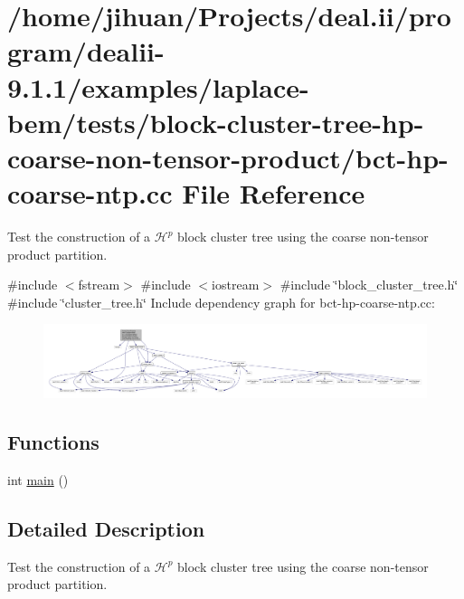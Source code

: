 \hypertarget{bct-hp-coarse-ntp_8cc}{}\section{/home/jihuan/\+Projects/deal.ii/program/dealii-\/9.1.1/examples/laplace-\/bem/tests/block-\/cluster-\/tree-\/hp-\/coarse-\/non-\/tensor-\/product/bct-\/hp-\/coarse-\/ntp.cc File Reference}
\label{bct-hp-coarse-ntp_8cc}


Test the construction of a $\mathcal{H}^p$ block cluster tree using the coarse non-\/tensor product partition.  


{\ttfamily \#include $<$fstream$>$}\newline
{\ttfamily \#include $<$iostream$>$}\newline
{\ttfamily \#include \char`\"{}block\+\_\+cluster\+\_\+tree.\+h\char`\"{}}\newline
{\ttfamily \#include \char`\"{}cluster\+\_\+tree.\+h\char`\"{}}\newline
Include dependency graph for bct-\/hp-\/coarse-\/ntp.cc\+:\nopagebreak
\begin{figure}[H]
\begin{center}
\leavevmode
\includegraphics[width=350pt]{bct-hp-coarse-ntp_8cc__incl}
\end{center}
\end{figure}
\subsection*{Functions}
\begin{DoxyCompactItemize}
\item 
int \hyperlink{bct-hp-coarse-ntp_8cc_ae66f6b31b5ad750f1fe042a706a4e3d4}{main} ()
\end{DoxyCompactItemize}


\subsection{Detailed Description}
Test the construction of a $\mathcal{H}^p$ block cluster tree using the coarse non-\/tensor product partition. 

